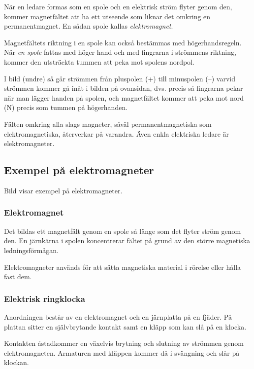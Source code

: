 När en ledare formas som en spole och en elektrisk ström flyter genom den,
kommer magnetfältet att ha ett utseende som liknar det omkring en
permanentmagnet.
En sådan spole kallas \emph{elektromagnet}.

Magnetfältets riktning i en spole kan också bestämmas med högerhandsregeln.
När \emph{en spole} fattas med höger hand och med fingrarna i strömmens
riktning, kommer den utsträckta tummen att peka mot spolens nordpol.

I bild  (undre) så går strömmen från pluspolen (+) till
minuspolen (--) varvid strömmen kommer gå inåt i bilden på ovansidan, dvs.
precis så fingrarna pekar när man lägger handen på spolen, och magnetfältet
kommer att peka mot nord (N) precis som tummen på högerhanden.

Fälten omkring alla slags magneter, såväl permanentmagnetiska som
elektromagnetiska, återverkar på varandra.
Även enkla elektriska ledare är elektromagneter.


\subsection{Exempel på elektromagneter}

Bild  visar exempel på elektromagneter.

\subsubsection{Elektromagnet}
Det bildas ett magnetfält genom en spole så länge som det flyter ström genom
den.
En järnkärna i spolen koncentrerar fältet på grund av den större magnetiska
ledningsförmågan.

Elektromagneter används för att sätta magnetiska material i rörelse eller hålla
fast dem.

\subsubsection{Elektrisk ringklocka}
Anordningen består av en elektromagnet och en järnplatta på en fjäder.
På plattan sitter en självbrytande kontakt samt en kläpp som kan slå på en
klocka.

Kontakten åstadkommer en växelvis brytning och slutning av strömmen genom
elektromagneten.
Armaturen med kläppen kommer då i svängning och slår på klockan.

